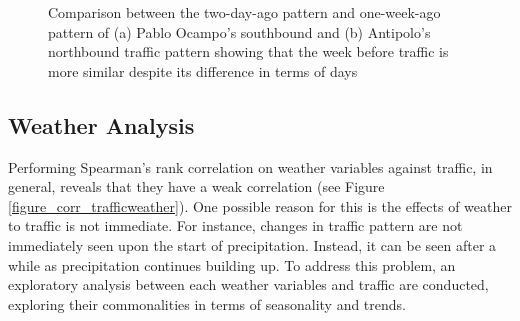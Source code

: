 \begin{figure}[h] 
\centering
    \centering
      \captionsetup{justification=centering}
    \hfill
    \caption{Comparison between the two-day-ago pattern and one-week-ago pattern of (a) Pablo Ocampo’s southbound and (b) Antipolo’s northbound traffic pattern showing that the week before traffic is more similar despite its difference in terms of days}

    \label{figure_traffic_day_vs_week}
\end{figure}




\subsection{Weather Analysis}

Performing Spearman's rank correlation on weather variables against traffic, in general, reveals that they have a weak correlation (see Figure \ref{figure_corr_trafficweather}). One possible reason for this is the effects of weather to traffic is not immediate. For instance, changes in traffic pattern are not immediately seen upon the start of precipitation. Instead, it can be seen after a while as precipitation continues building up. To address this problem, an exploratory analysis between each weather variables and traffic are conducted, exploring their commonalities in terms of seasonality and trends.


